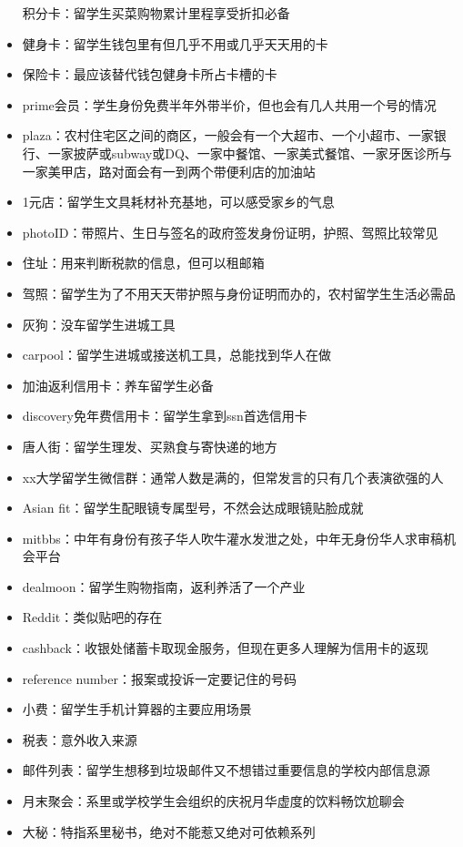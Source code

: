 \documentclass[]{tufte-book}
\begin{document}
\begin{itemize}
  积分卡：留学生买菜购物累计里程享受折扣必备
\item
  健身卡：留学生钱包里有但几乎不用或几乎天天用的卡
\item
  保险卡：最应该替代钱包健身卡所占卡槽的卡
\item
  prime会员：学生身份免费半年外带半价，但也会有几人共用一个号的情况
\item
  plaza：农村住宅区之间的商区，一般会有一个大超市、一个小超市、一家银行、一家披萨或subway或DQ、一家中餐馆、一家美式餐馆、一家牙医诊所与一家美甲店，路对面会有一到两个带便利店的加油站
\item
  1元店：留学生文具耗材补充基地，可以感受家乡的气息
\item
  photoID：带照片、生日与签名的政府签发身份证明，护照、驾照比较常见
\item
  住址：用来判断税款的信息，但可以租邮箱
\item
  驾照：留学生为了不用天天带护照与身份证明而办的，农村留学生生活必需品
\item
  灰狗：没车留学生进城工具
\item
  carpool：留学生进城或接送机工具，总能找到华人在做
\item
  加油返利信用卡：养车留学生必备
\item
  discovery免年费信用卡：留学生拿到ssn首选信用卡
\item
  唐人街：留学生理发、买熟食与寄快递的地方
\item
  xx大学留学生微信群：通常人数是满的，但常发言的只有几个表演欲强的人
\item
  Asian fit：留学生配眼镜专属型号，不然会达成眼镜贴脸成就
\item
  mitbbs：中年有身份有孩子华人吹牛灌水发泄之处，中年无身份华人求审稿机会平台
\item
  dealmoon：留学生购物指南，返利养活了一个产业
\item
  Reddit：类似贴吧的存在
\item
  cashback：收银处储蓄卡取现金服务，但现在更多人理解为信用卡的返现
\item
  reference number：报案或投诉一定要记住的号码
\item
  小费：留学生手机计算器的主要应用场景
\item
  税表：意外收入来源
\item
  邮件列表：留学生想移到垃圾邮件又不想错过重要信息的学校内部信息源
\item
  月末聚会：系里或学校学生会组织的庆祝月华虚度的饮料畅饮尬聊会
\item
  大秘：特指系里秘书，绝对不能惹又绝对可依赖系列

\end{itemize}
\end{document}
